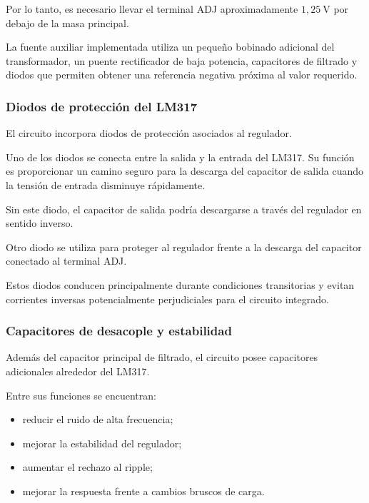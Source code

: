 \documentclass[12pt,a4paper]{article}
\begin{document}
	Por lo tanto, es necesario llevar el terminal ADJ aproximadamente
	$1,25~\text{V}$ por debajo de la masa principal.
	
	La fuente auxiliar implementada utiliza un pequeño bobinado adicional del
	transformador, un puente rectificador de baja potencia, capacitores de filtrado
	y diodos que permiten obtener una referencia negativa próxima al valor requerido.
	
	\subsubsection{Diodos de protección del LM317}
	
	El circuito incorpora diodos de protección asociados al regulador.
	
	Uno de los diodos se conecta entre la salida y la entrada del LM317. Su función
	es proporcionar un camino seguro para la descarga del capacitor de salida cuando
	la tensión de entrada disminuye rápidamente.
	
	Sin este diodo, el capacitor de salida podría descargarse a través del regulador
	en sentido inverso.
	
	Otro diodo se utiliza para proteger al regulador frente a la descarga del
	capacitor conectado al terminal ADJ.
	
	Estos diodos conducen principalmente durante condiciones transitorias y evitan
	corrientes inversas potencialmente perjudiciales para el circuito integrado.
	
	\subsubsection{Capacitores de desacople y estabilidad}
	
	Además del capacitor principal de filtrado, el circuito posee capacitores
	adicionales alrededor del LM317.
	
	Entre sus funciones se encuentran:
	
	\begin{itemize}
		
		\item reducir el ruido de alta frecuencia;
		
		\item mejorar la estabilidad del regulador;
		
		\item aumentar el rechazo al ripple;
		
		\item mejorar la respuesta frente a cambios bruscos de carga.
		
	\end{itemize}
	
\end{document}
